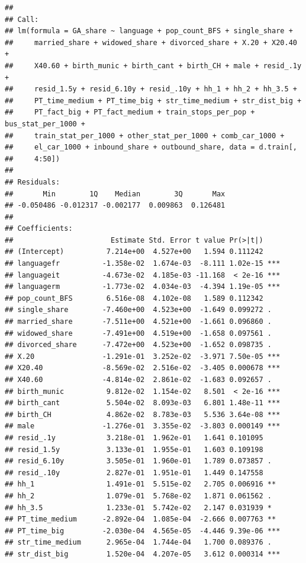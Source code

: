 \documentclass[
]{article}
\begin{document}
\begin{verbatim}
## 
## Call:
## lm(formula = GA_share ~ language + pop_count_BFS + single_share + 
##     married_share + widowed_share + divorced_share + X.20 + X20.40 + 
##     X40.60 + birth_munic + birth_cant + birth_CH + male + resid_.1y + 
##     resid_1.5y + resid_6.10y + resid_.10y + hh_1 + hh_2 + hh_3.5 + 
##     PT_time_medium + PT_time_big + str_time_medium + str_dist_big + 
##     PT_fact_big + PT_fact_medium + train_stops_per_pop + bus_stat_per_1000 + 
##     train_stat_per_1000 + other_stat_per_1000 + comb_car_1000 + 
##     el_car_1000 + inbound_share + outbound_share, data = d.train[, 
##     4:50])
## 
## Residuals:
##       Min        1Q    Median        3Q       Max 
## -0.050486 -0.012317 -0.002177  0.009863  0.126481 
## 
## Coefficients:
##                       Estimate Std. Error t value Pr(>|t|)    
## (Intercept)          7.214e+00  4.527e+00   1.594 0.111242    
## languagefr          -1.358e-02  1.674e-03  -8.111 1.02e-15 ***
## languageit          -4.673e-02  4.185e-03 -11.168  < 2e-16 ***
## languagerm          -1.773e-02  4.034e-03  -4.394 1.19e-05 ***
## pop_count_BFS        6.516e-08  4.102e-08   1.589 0.112342    
## single_share        -7.460e+00  4.523e+00  -1.649 0.099272 .  
## married_share       -7.511e+00  4.521e+00  -1.661 0.096860 .  
## widowed_share       -7.491e+00  4.519e+00  -1.658 0.097561 .  
## divorced_share      -7.472e+00  4.523e+00  -1.652 0.098735 .  
## X.20                -1.291e-01  3.252e-02  -3.971 7.50e-05 ***
## X20.40              -8.569e-02  2.516e-02  -3.405 0.000678 ***
## X40.60              -4.814e-02  2.861e-02  -1.683 0.092657 .  
## birth_munic          9.812e-02  1.154e-02   8.501  < 2e-16 ***
## birth_cant           5.504e-02  8.093e-03   6.801 1.48e-11 ***
## birth_CH             4.862e-02  8.783e-03   5.536 3.64e-08 ***
## male                -1.276e-01  3.355e-02  -3.803 0.000149 ***
## resid_.1y            3.218e-01  1.962e-01   1.641 0.101095    
## resid_1.5y           3.133e-01  1.955e-01   1.603 0.109198    
## resid_6.10y          3.505e-01  1.960e-01   1.789 0.073857 .  
## resid_.10y           2.827e-01  1.951e-01   1.449 0.147558    
## hh_1                 1.491e-01  5.515e-02   2.705 0.006916 ** 
## hh_2                 1.079e-01  5.768e-02   1.871 0.061562 .  
## hh_3.5               1.233e-01  5.742e-02   2.147 0.031939 *  
## PT_time_medium      -2.892e-04  1.085e-04  -2.666 0.007763 ** 
## PT_time_big         -2.030e-04  4.565e-05  -4.446 9.39e-06 ***
## str_time_medium      2.965e-04  1.744e-04   1.700 0.089376 .  
## str_dist_big         1.520e-04  4.207e-05   3.612 0.000314 ***

\end{verbatim}
\end{document}
